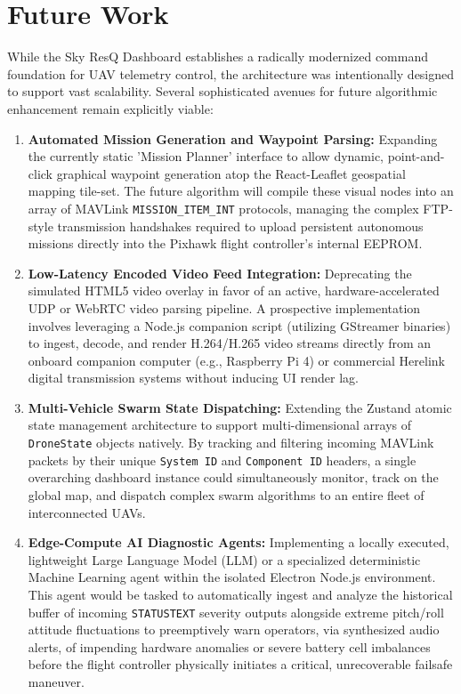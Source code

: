 \section{Future Work}
While the Sky ResQ Dashboard establishes a radically modernized command foundation for UAV telemetry control, the architecture was intentionally designed to support vast scalability. Several sophisticated avenues for future algorithmic enhancement remain explicitly viable:

\begin{enumerate}
    \item \textbf{Automated Mission Generation and Waypoint Parsing:} Expanding the currently static 'Mission Planner' interface to allow dynamic, point-and-click graphical waypoint generation atop the React-Leaflet geospatial mapping tile-set. The future algorithm will compile these visual nodes into an array of MAVLink \texttt{MISSION\_ITEM\_INT} protocols, managing the complex FTP-style transmission handshakes required to upload persistent autonomous missions directly into the Pixhawk flight controller's internal EEPROM.
    
    \item \textbf{Low-Latency Encoded Video Feed Integration:} Deprecating the simulated HTML5 video overlay in favor of an active, hardware-accelerated UDP or WebRTC video parsing pipeline. A prospective implementation involves leveraging a Node.js companion script (utilizing GStreamer binaries) to ingest, decode, and render H.264/H.265 video streams directly from an onboard companion computer (e.g., Raspberry Pi 4) or commercial Herelink digital transmission systems without inducing UI render lag.
    
    \item \textbf{Multi-Vehicle Swarm State Dispatching:} Extending the Zustand atomic state management architecture to support multi-dimensional arrays of \texttt{DroneState} objects natively. By tracking and filtering incoming MAVLink packets by their unique \texttt{System ID} and \texttt{Component ID} headers, a single overarching dashboard instance could simultaneously monitor, track on the global map, and dispatch complex swarm algorithms to an entire fleet of interconnected UAVs.
    
    \item \textbf{Edge-Compute AI Diagnostic Agents:} Implementing a locally executed, lightweight Large Language Model (LLM) or a specialized deterministic Machine Learning agent within the isolated Electron Node.js environment. This agent would be tasked to automatically ingest and analyze the historical buffer of incoming \texttt{STATUSTEXT} severity outputs alongside extreme pitch/roll attitude fluctuations to preemptively warn operators, via synthesized audio alerts, of impending hardware anomalies or severe battery cell imbalances before the flight controller physically initiates a critical, unrecoverable failsafe maneuver.
\end{enumerate}
